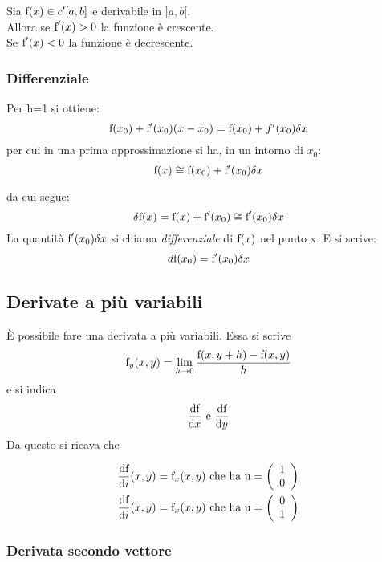 		  \begin{cor}[Lagrange 3]
		   Sia $\text{f}(x)\in c'[a,b]$ e derivabile in $]a,b[$.\\ Allora se $\text{f}'(x)>0$ la funzione è crescente.\\ Se $\text{f}'(x)<0$ la funzione è decrescente.
		  \end{cor}
		  
\subsubsection{Differenziale}

Per h=1 si ottiene:
\[
\text{\text{f}}(x_0)+\text{\text{f}}'(x_0)(x-x_0)=\text{\text{f}}(x_0)+f'(x_0)\delta x
\]
per cui in una prima approssimazione si ha, in un intorno di $x_0$:
\[
\text{f}(x)\cong \text{\text{f}}(x_0)+\text{\text{f}}'(x_0)\delta x
\]

da cui segue:
\[
\delta \text{\text{f}}(x)=\text{\text{f}}(x)+\text{\text{f}}'(x_0)\cong \text{\text{f}}'(x_0)\delta x
\]
La quantità $\text{f}'(x_0)\delta x$ si chiama \textit{differenziale} di $\text{f}(x)$ nel punto x. E si scrive:
\[
d\text{\text{f}}(x_0)=\text{\text{f}}'(x_0)\delta x
\]

\subsection{Derivate a più variabili}
È possibile fare una derivata a più variabili. Essa si scrive
\[
\text{\text{f}}_y(x,y)=\mathop{\lim}\limits_{h \to 0} \frac{\text{\text{f}}(x,y+h)-\text{\text{f}}(x,y)}{h}
\]
e si indica
\[
\frac{{\rm d}\text{\text{f}}}{{\rm d}x}\text{ e }\frac{{\rm d}\text{\text{f}}}{{\rm d}y}
\]
Da questo si ricava che

\begin{gather*}
\frac{{\rm d}\text{f}}{{\rm d}i}(x,y)=
{\text{f}}_x(x,y)\text{ che ha u}=\left({
\begin{array}{c}
  {1}  \\
  {0}  \\
\end{array}
}\right)\\
\frac{{\rm d}\text{\text{f}}}{{\rm d}i}(x,y)=\text{\text{f}}_x(x,y)\text{ che ha u}
=\left({
\begin{array}{c}
  {0}  \\
  {1}  \\
\end{array}
}\right)
\end{gather*}


\subsubsection{Derivata secondo vettore}

